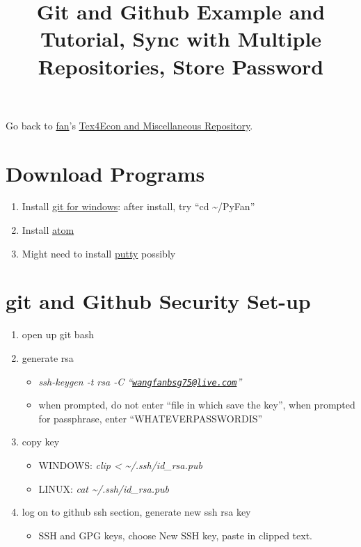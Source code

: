 \documentclass[]{article}
\title{Git and Github Example and Tutorial, Sync with Multiple Repositories,
Store Password}
\author{}
\date{\vspace{-2.5em}}
\providecommand{\tightlist}{%
  \setlength{\itemsep}{0pt}\setlength{\parskip}{0pt}}
\begin{document}
\maketitle

Go back to \href{http://fanwangecon.github.io/}{fan}'s
\href{http://fanwangecon.github.io/Tex4Econ/}{Tex4Econ and Miscellaneous
Repository}.

\hypertarget{download-programs}{%
\section{Download Programs}\label{download-programs}}

\begin{enumerate}
\def\labelenumi{\arabic{enumi}.}
\tightlist
\item
  Install \href{https://git-scm.com/download/win}{git for windows}:
  after install, try ``cd \textasciitilde{}/PyFan''
\item
  Install \href{https://atom.io/}{atom}
\item
  Might need to install \href{https://www.putty.org/}{putty} possibly
\end{enumerate}

\hypertarget{git-and-github-security-set-up}{%
\section{git and Github Security
Set-up}\label{git-and-github-security-set-up}}

\begin{enumerate}
\def\labelenumi{\arabic{enumi}.}
\tightlist
\item
  open up git bash
\item
  generate rsa

  \begin{itemize}
  \tightlist
  \item
    \emph{ssh-keygen -t rsa -C
    ``\href{mailto:wangfanbsg75@live.com}{\nolinkurl{wangfanbsg75@live.com}}''}
  \item
    when prompted, do not enter ``file in which save the key'', when
    prompted for passphrase, enter ``WHATEVERPASSWORDIS''
  \end{itemize}
\item
  copy key

  \begin{itemize}
  \tightlist
  \item
    WINDOWS: \emph{clip \textless{} \textasciitilde{}/.ssh/id\_rsa.pub}
  \item
    LINUX: \emph{cat \textasciitilde{}/.ssh/id\_rsa.pub}
  \end{itemize}
\item
  log on to github ssh section, generate new ssh rsa key

  \begin{itemize}
  \tightlist
  \item
    SSH and GPG keys, choose New SSH key, paste in clipped text.
  \end{itemize}
\end{enumerate}
\end{document}
